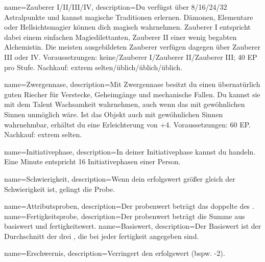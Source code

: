{
    name={Zauberer I/II/III/IV},
    description={Du verfügst über 8/16/24/32 Astralpunkte und kannst magische Traditionen erlernen. Dämonen, Elementare oder Hellsichtsmagier können dich magisch wahrnehmen. Zauberer I entspricht dabei einem einfachen Magiedilettanten, Zauberer II einer wenig begabten Alchemistin. Die meisten ausgebildeten Zauberer verfügen dagegen über Zauberer III oder IV. Voraussetzungen: keine/Zauberer I/Zauberer II/Zauberer III; 40 EP pro Stufe. Nachkauf: extrem selten/üblich/üblich/üblich.}}

{
    name={Zwergennase},
    description={Mit Zwergennase besitzt du einen übernatürlich guten Riecher für Verstecke, Geheimgänge und mechanische Fallen. Du kannst sie mit dem Talent Wachsamkeit wahrnehmen, auch wenn das mit gewöhnlichen Sinnen unmöglich wäre. Ist das Objekt auch mit gewöhnlichen Sinnen wahrnehmbar, erhältst du eine Erleichterung von +4. Voraussetzungen: 60 EP. Nachkauf: extrem selten.}}
        
{
    name=Initiativephase,
    description={In deiner Initiativephase kannst du handeln. Eine Minute entspricht 16 Initiativephasen einer Person.}
}

{
	name={Schwierigkeit},
	description={Wenn dein \gls{erfolgswert} größer gleich der Schwierigkeit ist, gelingt die Probe.}
}

{
    name={Attributsproben},
    description={Der \gls{probenwert} beträgt das doppelte des .}
}
{
    name={Fertigkeitsprobe},
    description={Der \gls{probenwert} beträgt die Summe aus \gls{basiswert} und \gls{fertigkeitswert}.}
}
{
    name={Basiswert},
    description={Der Basiswert ist der Durchschnitt der drei , die bei jeder \gls{fertigkeit} angegeben sind.}}

{
    name={Erschwernis},
    description={Verringert den \gls{erfolgswert} (bspw. -2).}}
    
